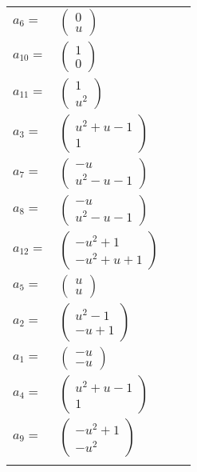 \documentclass[1p]{elsarticle_modified}
\theoremstyle{definition}
\begin{document}
\begin{tabular}{m{7pt} m{180pt} m{7pt} m{180pt} }
\flushright $a_{6}=$&$\begin{pmatrix}0\\u\end{pmatrix}$ \\
\flushright $a_{10}=$&$\begin{pmatrix}1\\0\end{pmatrix}$ \\
\flushright $a_{11}=$&$\begin{pmatrix}1\\u^2\end{pmatrix}$ \\
\flushright $a_{3}=$&$\begin{pmatrix}u^2+u-1\\1\end{pmatrix}$ \\
\flushright $a_{7}=$&$\begin{pmatrix}- u\\u^2- u-1\end{pmatrix}$ \\
\flushright $a_{8}=$&$\begin{pmatrix}- u\\u^2- u-1\end{pmatrix}$ \\
\flushright $a_{12}=$&$\begin{pmatrix}- u^2+1\\- u^2+u+1\end{pmatrix}$ \\
\flushright $a_{5}=$&$\begin{pmatrix}u\\u\end{pmatrix}$ \\
\flushright $a_{2}=$&$\begin{pmatrix}u^2-1\\- u+1\end{pmatrix}$ \\
\flushright $a_{1}=$&$\begin{pmatrix}- u\\- u\end{pmatrix}$ \\
\flushright $a_{4}=$&$\begin{pmatrix}u^2+u-1\\1\end{pmatrix}$ \\
\flushright $a_{9}=$&$\begin{pmatrix}- u^2+1\\- u^2\end{pmatrix}$\\&\end{tabular}
\end{document}
